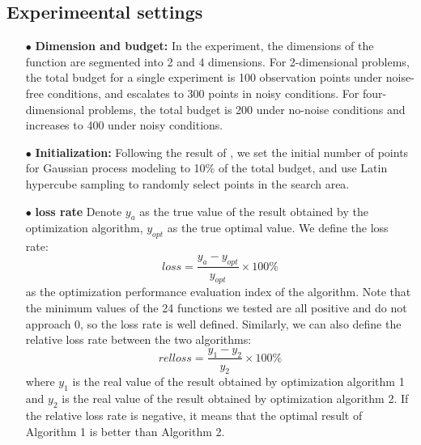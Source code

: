\documentclass{article}
\begin{document}
\subsection{Experimeental settings}
\begin{itemize}[itemsep=2pt,topsep=0pt,parsep=0pt]
\item[$\bullet$] \textbf{Dimension and budget:} In the experiment, the dimensions of the function are segmented into 2 and 4 dimensions. For 2-dimensional problems, the total budget for a single experiment is 100 observation points under noise-free conditions, and escalates to 300 points in noisy conditions. For four-dimensional problems, the total budget is 200 under no-noise conditions and increases to 400 under noisy conditions.
\item[$\bullet$] \textbf{Initialization:} Following the result of \citep{Bossek2020Initial}, we set the initial number of points for Gaussian process modeling to 10$\%$ of the total budget, and use Latin hypercube sampling to randomly select points in the search area.
\item[$\bullet$] \textbf{loss rate} Denote $y_a$ as the true value of the result obtained by the optimization algorithm, $y_{opt}$ as the true optimal value. We define the loss rate:
\begin{equation}\label{eq9}
	loss = \frac{y_a - y_{opt}}{y_{opt}}\times 100\%
\end{equation}
 as the optimization performance evaluation index of the algorithm. Note that the minimum values of the 24 functions we tested are all positive and do not approach 0, so the loss rate is well defined. Similarly, we can also define the relative loss rate between the two algorithms:
\begin{equation}\label{eq10}
	relloss = \frac{y_1 - y_2}{y_2}\times 100\%
\end{equation}
 where $y_1$ is the real value of the result obtained by optimization algorithm 1 and $y_2$ is the real value of the result obtained by optimization algorithm 2. If the relative loss rate is negative, it means that the optimal result of Algorithm 1 is better than Algorithm 2.


\end{itemize}
\end{document}
